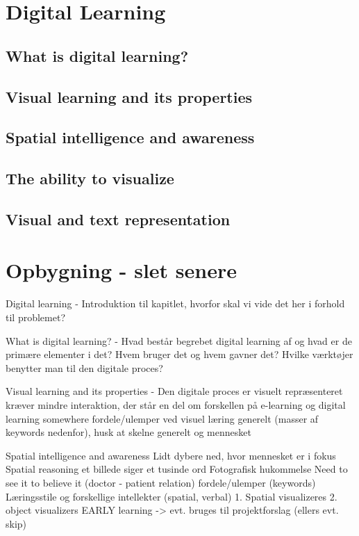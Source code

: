 \section{Digital Learning}\label{ch:digital_learning_ch}
\subsection{What is digital learning?}\label{ch:what_is_digital_learning}
\subsection{Visual learning and its properties}\label{ch:visual_learning_and_its_properties}
\subsection{Spatial intelligence and awareness}\label{ch:spatial_intelligence_and_awareness}
\subsection{The ability to visualize}\label{ch:the_ability_to_visualize}
\subsection{Visual and text representation}\label{ch:spatial_intelligence_and_awareness}

\section{Opbygning - slet senere}\label{ch:opbygning}
Digital learning - Introduktion til kapitlet, hvorfor skal vi vide det her i forhold til problemet?

What is digital learning? - Hvad består begrebet digital learning af og hvad er de primære elementer i det? 
    Hvem bruger det og hvem gavner det? 
    Hvilke værktøjer benytter man til den digitale proces?

  Visual learning and its properties - Den digitale proces er visuelt repræsenteret
    kræver mindre interaktion, der står en del om forskellen på e-learning og digital learning somewhere
    fordele/ulemper ved visuel læring generelt (masser af keywords nedenfor), husk at skelne generelt og mennesket

  Spatial intelligence and awareness
    Lidt dybere ned, hvor mennesket er i fokus
    Spatial reasoning
    et billede siger et tusinde ord
    Fotografisk hukommelse
    Need to see it to believe it (doctor - patient relation)
    fordele/ulemper (keywords)
    Læringsstile og forskellige intellekter (spatial, verbal)
    1. Spatial visualizeres 2. object visualizers
    EARLY learning -> evt. bruges til projektforslag (ellers evt. skip)
  
